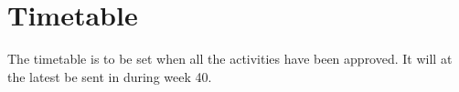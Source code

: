 \section{Timetable}
The timetable is to be set when all the activities have been approved. It will at the latest be sent in during week 40.
